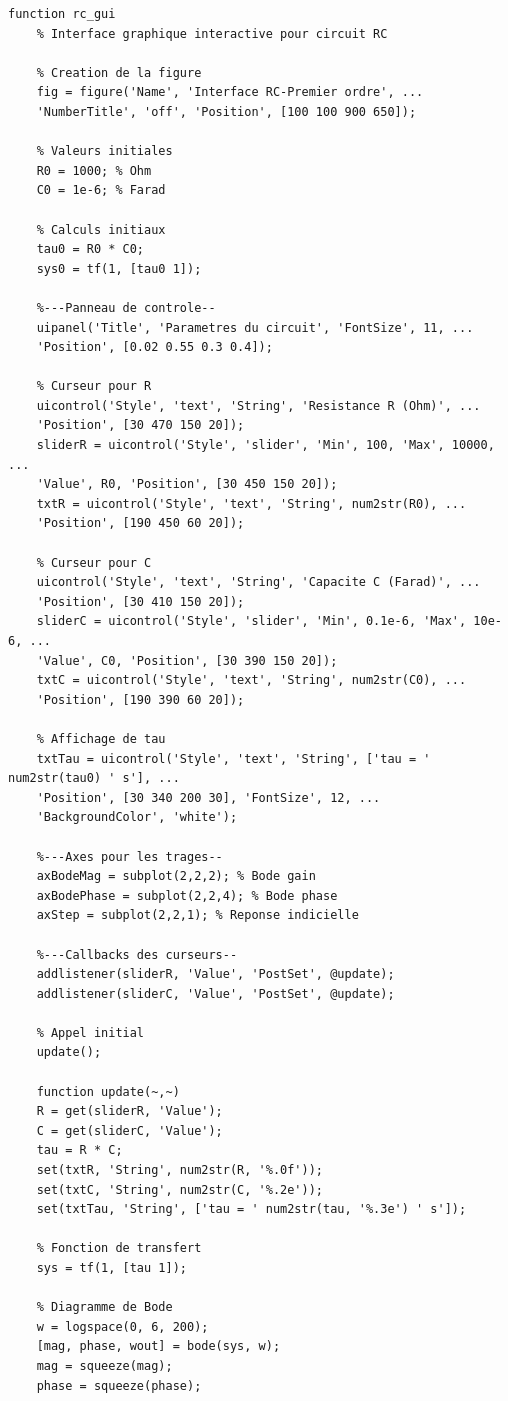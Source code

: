 \documentclass[12pt,a4paper]{article}
\begin{document}
	\begin{lstlisting}[caption=Script MATLAB de l'interface graphique]
	function rc_gui
	% Interface graphique interactive pour circuit RC
	
	% Creation de la figure
	fig = figure('Name', 'Interface RC-Premier ordre', ...
	'NumberTitle', 'off', 'Position', [100 100 900 650]);
	
	% Valeurs initiales
	R0 = 1000; % Ohm
	C0 = 1e-6; % Farad
	
	% Calculs initiaux
	tau0 = R0 * C0;
	sys0 = tf(1, [tau0 1]);
	
	%---Panneau de controle--
	uipanel('Title', 'Parametres du circuit', 'FontSize', 11, ...
	'Position', [0.02 0.55 0.3 0.4]);
	
	% Curseur pour R
	uicontrol('Style', 'text', 'String', 'Resistance R (Ohm)', ...
	'Position', [30 470 150 20]);
	sliderR = uicontrol('Style', 'slider', 'Min', 100, 'Max', 10000, ...
	'Value', R0, 'Position', [30 450 150 20]);
	txtR = uicontrol('Style', 'text', 'String', num2str(R0), ...
	'Position', [190 450 60 20]);
	
	% Curseur pour C
	uicontrol('Style', 'text', 'String', 'Capacite C (Farad)', ...
	'Position', [30 410 150 20]);
	sliderC = uicontrol('Style', 'slider', 'Min', 0.1e-6, 'Max', 10e-6, ...
	'Value', C0, 'Position', [30 390 150 20]);
	txtC = uicontrol('Style', 'text', 'String', num2str(C0), ...
	'Position', [190 390 60 20]);
	
	% Affichage de tau
	txtTau = uicontrol('Style', 'text', 'String', ['tau = ' num2str(tau0) ' s'], ...
	'Position', [30 340 200 30], 'FontSize', 12, ...
	'BackgroundColor', 'white');
	
	%---Axes pour les trages--
	axBodeMag = subplot(2,2,2); % Bode gain
	axBodePhase = subplot(2,2,4); % Bode phase
	axStep = subplot(2,2,1); % Reponse indicielle
	
	%---Callbacks des curseurs--
	addlistener(sliderR, 'Value', 'PostSet', @update);
	addlistener(sliderC, 'Value', 'PostSet', @update);
	
	% Appel initial
	update();
	
	function update(~,~)
	R = get(sliderR, 'Value');
	C = get(sliderC, 'Value');
	tau = R * C;
	set(txtR, 'String', num2str(R, '%.0f'));
	set(txtC, 'String', num2str(C, '%.2e'));
	set(txtTau, 'String', ['tau = ' num2str(tau, '%.3e') ' s']);
	
	% Fonction de transfert
	sys = tf(1, [tau 1]);
	
	% Diagramme de Bode
	w = logspace(0, 6, 200); 
	[mag, phase, wout] = bode(sys, w);
	mag = squeeze(mag);
	phase = squeeze(phase);
	

\end{lstlisting}
\end{document}
